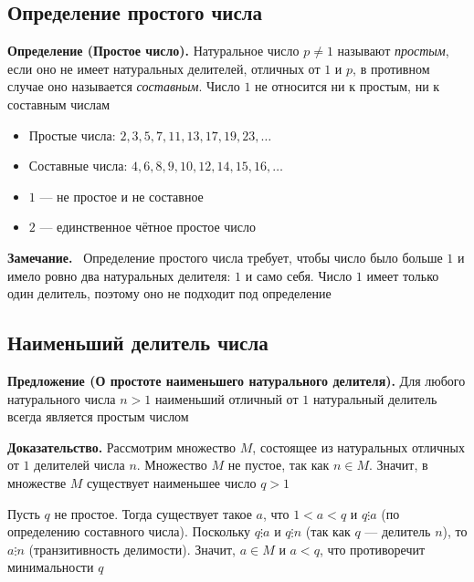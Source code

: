\documentclass[a4paper,12pt]{article}
\newcommand{\myremark}{\textbf{Замечание.}\ }
\theoremstyle{definition}
\theoremstyle{plain}
\theoremstyle{remark}
\begin{document}
	\subsection{Определение простого числа}
	
	\noindent \textbf{Определение (Простое число).}
	Натуральное число $p \neq 1$ называют \textit{простым}, если оно не имеет натуральных делителей, отличных от $1$ и $p$, в противном случае оно называется \textit{составным}. Число $1$ не относится ни к простым, ни к составным числам
	
	\begin{tcolorbox}[colback=blue!5, colframe=blue!40!black, title=Примеры]
		\begin{itemize}
			\item Простые числа: $2, 3, 5, 7, 11, 13, 17, 19, 23, \dots$
			\item Составные числа: $4, 6, 8, 9, 10, 12, 14, 15, 16, \dots$
			\item $1$ — не простое и не составное
			\item $2$ — единственное чётное простое число
		\end{itemize}
	\end{tcolorbox}
	
	\myremark
	Определение простого числа требует, чтобы число было больше $1$ и имело ровно два натуральных делителя: $1$ и само себя. Число $1$ имеет только один делитель, поэтому оно не подходит под определение
	
	\subsection{Наименьший делитель числа}
	
	\noindent \textbf{Предложение (О простоте наименьшего натурального делителя).}
	Для любого натурального числа $n > 1$ наименьший отличный от $1$ натуральный делитель всегда является простым числом
	
	\medskip
	\noindent \textbf{Доказательство.}
	Рассмотрим множество $M$, состоящее из натуральных отличных от $1$ делителей числа $n$. Множество $M$ не пустое, так как $n \in M$. Значит, в множестве $M$ существует наименьшее число $q > 1$
	
	Пусть $q$ не простое. Тогда существует такое $a$, что $1 < a < q$ и $q \vdots a$ (по определению составного числа). Поскольку $q \vdots a$ и $q \vdots n$ (так как $q$ — делитель $n$), то $a \vdots n$ (транзитивность делимости). Значит, $a \in M$ и $a < q$, что противоречит минимальности $q$
	
\end{document}
